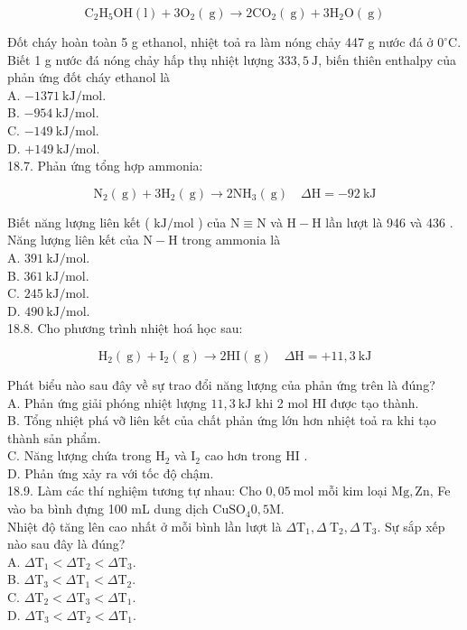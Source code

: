 \documentclass[10pt]{article}
\begin{document}
$$
\mathrm{C}_{2} \mathrm{H}_{5} \mathrm{OH}(\mathrm{l})+3 \mathrm{O}_{2}(\mathrm{~g}) \rightarrow 2 \mathrm{CO}_{2}(\mathrm{~g})+3 \mathrm{H}_{2} \mathrm{O}(\mathrm{~g})
$$

Đốt cháy hoàn toàn 5 g ethanol, nhiệt toả ra làm nóng chảy 447 g nước đá ở $0^{\circ} \mathrm{C}$. Biết 1 g nước đá nóng chảy hấp thụ nhiệt lượng $333,5 \mathrm{~J}$, biến thiên enthalpy của phản ứng đốt cháy ethanol là\\
A. $-1371 \mathrm{~kJ} / \mathrm{mol}$.\\
B. $-954 \mathrm{~kJ} / \mathrm{mol}$.\\
C. $-149 \mathrm{~kJ} / \mathrm{mol}$.\\
D. $+149 \mathrm{~kJ} / \mathrm{mol}$.\\
18.7. Phản ứng tổng hợp ammonia:

$$
\mathrm{N}_{2}(\mathrm{~g})+3 \mathrm{H}_{2}(\mathrm{~g}) \rightarrow 2 \mathrm{NH}_{3}(\mathrm{~g}) \quad \Delta \mathrm{H}=-92 \mathrm{~kJ}
$$

Biết năng lượng liên kết ( $\mathrm{kJ} / \mathrm{mol}$ ) của $\mathrm{N} \equiv \mathrm{N}$ và $\mathrm{H}-\mathrm{H}$ lần lượt là 946 và 436 . Năng lượng liên kết của $\mathrm{N}-\mathrm{H}$ trong ammonia là\\
A. $391 \mathrm{~kJ} / \mathrm{mol}$.\\
B. $361 \mathrm{~kJ} / \mathrm{mol}$.\\
C. $245 \mathrm{~kJ} / \mathrm{mol}$.\\
D. $490 \mathrm{~kJ} / \mathrm{mol}$.\\
18.8. Cho phương trình nhiệt hoá học sau:

$$
\mathrm{H}_{2}(\mathrm{~g})+\mathrm{I}_{2}(\mathrm{~g}) \rightarrow 2 \mathrm{HI}(\mathrm{~g}) \quad \Delta \mathrm{H}=+11,3 \mathrm{~kJ}
$$

Phát biểu nào sau đây về sự trao đổi năng lượng của phản ứng trên là đúng?\\
A. Phản ứng giải phóng nhiệt lượng $11,3 \mathrm{~kJ}$ khi 2 mol HI được tạo thành.\\
B. Tổng nhiệt phá vỡ liên kết của chất phản ứng lớn hơn nhiệt toả ra khi tạo thành sản phẩm.\\
C. Năng lượng chứa trong $\mathrm{H}_{2}$ và $\mathrm{I}_{2}$ cao hơn trong HI .\\
D. Phản ứng xảy ra với tốc độ chậm.\\
18.9. Làm các thí nghiệm tương tự nhau: Cho $0,05 \mathrm{~mol}$ mỗi kim loại $\mathrm{Mg}, \mathrm{Zn}$, Fe vào ba bình đựng 100 mL dung dịch $\mathrm{CuSO}_{4} 0,5 \mathrm{M}$.\\
Nhiệt độ tăng lên cao nhất ở mỗi bình lần lượt là $\Delta \mathrm{T}_{1}, \Delta \mathrm{~T}_{2}, \Delta \mathrm{~T}_{3}$. Sự sắp xếp nào sau đây là đúng?\\
A. $\Delta \mathrm{T}_{1}<\Delta \mathrm{T}_{2}<\Delta \mathrm{T}_{3}$.\\
B. $\Delta \mathrm{T}_{3}<\Delta \mathrm{T}_{1}<\Delta \mathrm{T}_{2}$.\\
C. $\Delta \mathrm{T}_{2}<\Delta \mathrm{T}_{3}<\Delta \mathrm{T}_{1}$.\\
D. $\Delta \mathrm{T}_{3}<\Delta \mathrm{T}_{2}<\Delta \mathrm{T}_{1}$.
\end{document}
